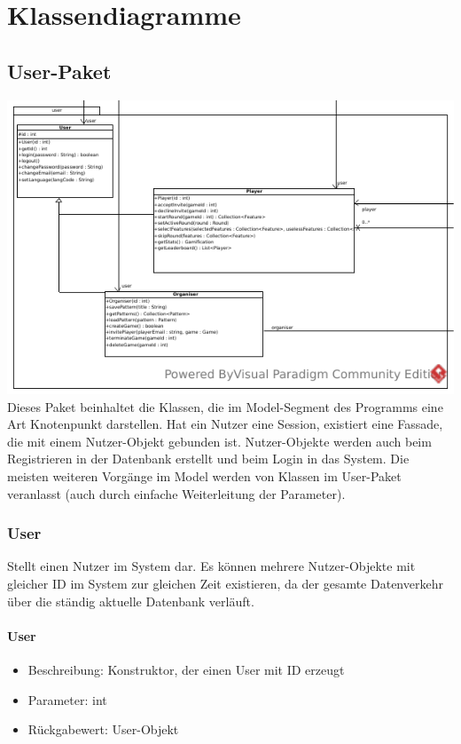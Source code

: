 \documentclass[a4paper]{scrreprt}
\begin{document}
    \chapter{Klassendiagramme}

    \section{User-Paket}
    \includegraphics[width=\textwidth]{img/package/user.pdf}
    Dieses Paket beinhaltet die Klassen, die im Model-Segment des Programms eine Art Knotenpunkt darstellen. Hat ein Nutzer eine Session, existiert
    eine Fassade, die mit einem Nutzer-Objekt gebunden ist. Nutzer-Objekte werden auch beim Registrieren in der Datenbank erstellt und beim Login
    in das System. Die meisten weiteren Vorgänge im Model werden von Klassen im User-Paket veranlasst (auch durch einfache Weiterleitung der Parameter).
    \subsection{User}
    Stellt einen Nutzer im System dar. Es können mehrere Nutzer-Objekte mit gleicher ID im System zur gleichen Zeit existieren, da der gesamte Datenverkehr über die ständig aktuelle Datenbank verläuft.
    \subsubsection{User}
    \begin{itemize}
        \item Beschreibung: Konstruktor, der einen User mit ID erzeugt
        \item Parameter: int
        \item Rückgabewert: User-Objekt
    \end{itemize}
\end{document}
